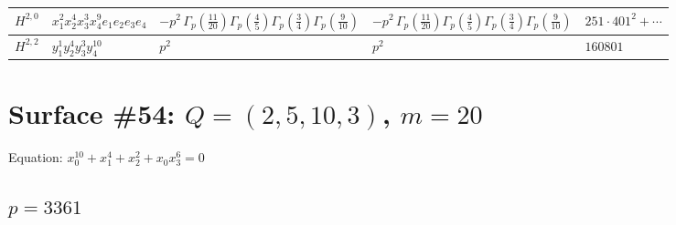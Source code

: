 \documentclass[11pt]{article}
\begin{document}
\begin{table}[ht]
{\begin{tabular}{@{}lllll@{}}
\midrule
$H^{2,0}$ & $x_{1}^{2} x_{2}^{4} x_{3}^{3} x_{4}^{9}  e_{1} e_{2} e_{3} e_{4}$ & $- p^{2} \, \Gamma_p \left( \frac{11}{20} \right) \Gamma_p \left( \frac{4}{5} \right) \Gamma_p \left( \frac{3}{4} \right) \Gamma_p \left( \frac{9}{10} \right)$ & $- p^{2} \, \Gamma_p \left( \frac{11}{20} \right) \Gamma_p \left( \frac{4}{5} \right) \Gamma_p \left( \frac{3}{4} \right) \Gamma_p \left( \frac{9}{10} \right)$ & $251{\cdot}401^{2}{+}\cdots$ \\
\midrule
$H^{2,2}$ & $y_{1}^{1} y_{2}^{4} y_{3}^{3} y_{4}^{10}$ & $p^{2} \,$ & $p^{2} \,$ & $160801$ \\
\bottomrule
\end{tabular}
}
\renewcommand{\arraystretch}{1.0}
\end{table}

\newpage

\section*{Surface \#54: $Q=(2, 5, 10, 3)$, $m=20$}

Equation: $x_0^{10} + x_1^{4} + x_2^{2} + x_0 x_3^{6} = 0$

\subsection*{$p = 3361$}
\end{document}
